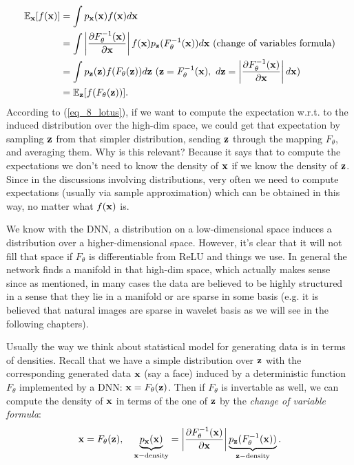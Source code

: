 \documentclass[../main.tex]{subfiles}
\begin{document}
\begin{align*}
\mathbb{E}_{\bf x}[f({\bf x})]&=\int p_{\bf x}({\bf x})f({\bf x})d{\bf x}\\
&=\int \left|\frac{\partial F_{\theta}^{-1}({\bf x})}{\partial {\bf x}} \right|f({\bf x})p_{\bf z} (F_{\theta}^{-1}({\bf x})) d{\bf x}\ \text{(change of variables formula)}\\
&=\int p_{\bf z}({\bf z})f(F_{\theta}({\bf z}))d{\bf z}\ ({\bf z}=F_{\theta}^{-1}({\bf x}),\ d{\bf z}=\left|\frac{\partial F_{\theta}^{-1}({\bf x})}{\partial {\bf x}} \right|d{\bf x})\\
&=\mathbb{E}_{\bf z}[f(F_{\theta}({\bf z}))].
\end{align*}
According to (\ref{eq_8_lotus}), if we want to compute the expectation w.r.t. to the induced distribution over the high-dim space, we could get that expectation by sampling ${\bf z}$ from that simpler distribution, sending ${\bf z}$ through the mapping $F_{\theta}$, and averaging them. Why is this relevant? Because it says that to compute the expectations we don't need to know the density of ${\bf x}$ if we know the density of ${\bf z}$. Since in the discussions involving distributions, very often we need to compute expectations (usually via sample approximation) which can be obtained in this way, no matter what $f({\bf x})$ is.
\begin{remark}
	We know with the DNN, a distribution on a low-dimensional space induces a distribution over a higher-dimensional space. However, it's clear that it will not fill that space if $F_{\theta}$ is differentiable from ReLU and things we use. In general the network finds a manifold in that high-dim space, which actually makes sense since as mentioned, in many cases the data are believed to be highly structured in a sense that they lie in a manifold or are sparse in some basis (e.g. it is believed that natural images are sparse in wavelet basis as we will see in the following chapters). 
\end{remark}
\par Usually the way we think about statistical model for generating data is in terms of densities. Recall that we have a simple distribution over ${\bf z}$ with the corresponding generated data ${\bf x}$ (say a face) induced by a deterministic function $F_{\theta}$ implemented by a DNN: ${\bf x}=F_{\theta}({\bf z})$. Then if $F_{\theta}$ is invertable as well, we can compute the density of ${\bf x}$ in terms of the one of ${\bf z}$ by the \emph{change of variable formula}:
\begin{equation}\label{eq_8_chg_var}
{\bf x}=F_{\theta}({\bf z}),\quad \underbrace{p_{\bf x}({\bf x})}_{{\bf x}-\text{density}}=\left|\frac{\partial F_{\theta}^{-1}({\bf x})}{\partial {\bf x}}\right|\underbrace{p_{\bf z}(F_{\theta}^{-1}({\bf x}))}_{{\bf z}-{\rm density}}.
\end{equation}
\end{document}

